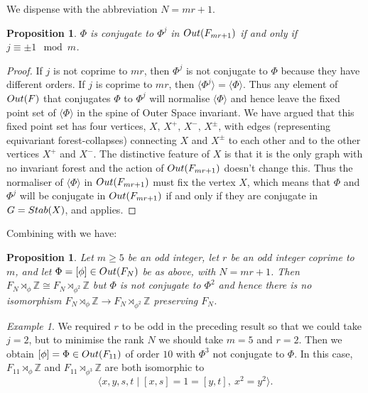 \documentclass[11pt, a4 paper]{amsart}
\numberwithin{equation}{section}
\newtheorem{proposition}[theorem]{Proposition}
\theoremstyle{remark}
\newtheorem{example}[theorem]{Example}
\theoremstyle{definition}
\def\Z{\mathbb Z}
\def\out{{\rm{Out}}}
\def\<{\langle}
\def\>{\rangle}
\begin{document}
We dispense with the abbreviation $N=mr+1$. 

\begin{proposition}
\label{p:not-conj}
	$\Phi$ is conjugate to $\Phi^j$ in ${\rm{Out}}(F_{mr+1})$ 
	if and only if $j \equiv \pm 1 \mod m$. 
\end{proposition}

\begin{proof} 
	If $j$ is not coprime to $mr$, 
	then $\Phi^j$ is not conjugate to $\Phi$ 
	because	they have different orders. 
	If $j$ is coprime to $mr$, then $\<\Phi^j\>=\<\Phi\>$. 
	Thus any element of $\out(F)$ 
	that conjugates $\Phi$ to $\Phi^j$ 
	will normalise $\<\Phi\>$ 
	and hence leave the fixed point set of $\<\Phi\>$ 
	in the spine of Outer Space invariant. 
	We have argued that this fixed point set 
	has four vertices, $X,\, X^+,\, X^-,\, X^\pm$, 
	with edges (representing equivariant forest-collapses) 
	connecting $X$ and $X^\pm$ to each other 
	and to the other vertices $X^+$ and $X^-$. 
	The distinctive feature of $X$ is that 
	it is the only graph with no invariant forest 
	and the action of $\out(F_{mr+1})$ doesn't change this. 
	Thus the normaliser 
	of $\<\Phi\>$ in ${\rm{Out}}(F_{mr+1})$ 
	must fix the vertex $X$, 
	which means that $\Phi$ and $\Phi^j$ 
	will be conjugate in ${\rm{Out}}(F_{mr+1})$ if and only if 
	they are conjugate in $G={\rm{Stab}}(X)$, 
	and  applies. 
\end{proof}

Combining  with  we have: 

\begin{proposition} 
	Let $m\ge 5$ be an odd integer, 
	let $r$ be an odd integer coprime to $m$, 
	and let $\Phi = [\phi]\in {\rm{Out}}(F_{N})$ be as above, 
	with $N=mr+1$. 
	Then $F_N\rtimes_{\phi}\Z\cong F_N\rtimes_{\phi^2}\Z$ 
	but $\Phi$ is not conjugate	to $\Phi^2$ 
	and hence there is no isomorphism 
	$F_N\rtimes_{\phi}\Z\to F_N\rtimes_{\phi^2}\Z$ 
	preserving $F_N$.
\end{proposition}


\begin{example} 
	We required $r$ to be odd in the preceding result 
	so that we could take $j=2$, 
	but to minimise the rank $N$ 
	we should take $m=5$ and $r=2$. 
	Then we obtain $[\phi]=\Phi\in\out(F_{11})$ of order $10$ 
	with $\Phi^3$ not conjugate to $\Phi$. 
	In this case, 
	$F_{11}\rtimes_\phi\Z$ and $F_{11}\rtimes_{\phi^3}\Z$
	are both isomorphic to 
	$$
	\< x, y, s, t \mid  [x,s]=1=[y,t],\ x^2=y^2 \>.
	$$
\end{example}
\end{document}
